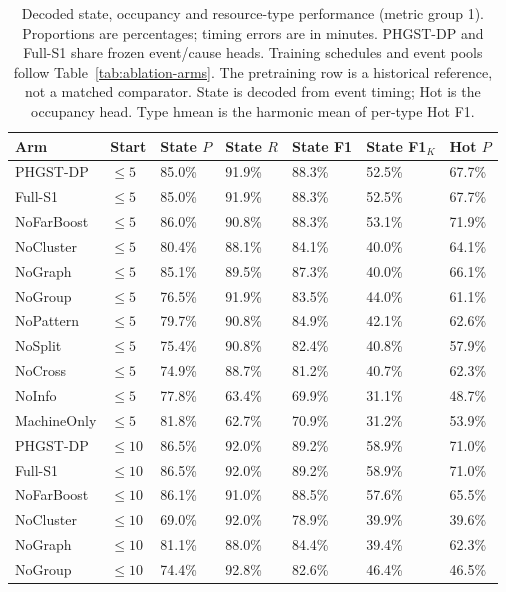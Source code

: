 \begin{table}[p]
\centering
\scriptsize
\setlength{\tabcolsep}{3pt}
\renewcommand{\arraystretch}{1.12}
\caption{Decoded state, occupancy and resource-type performance (metric group 1). Proportions are percentages; timing errors are in minutes. PHGST-DP and Full-S1 share frozen event/cause heads. Training schedules and event pools follow Table~\ref{tab:ablation-arms}. The pretraining row is a historical reference, not a matched comparator. State is decoded from event timing; Hot is the occupancy head. Type hmean is the harmonic mean of per-type Hot F1.}
\label{tab:complete-3-1}
\begin{tabularx}{\textwidth}{@{}lXXXXXX@{}}
\toprule
Arm & Start & State $P$ & State $R$ & State F1 & State F1$_K$ & Hot $P$ \\
\midrule
PHGST-DP & $\le 5$ & 85.0\% & 91.9\% & 88.3\% & 52.5\% & 67.7\% \\
Full-S1 & $\le 5$ & 85.0\% & 91.9\% & 88.3\% & 52.5\% & 67.7\% \\
NoFarBoost & $\le 5$ & 86.0\% & 90.8\% & 88.3\% & 53.1\% & 71.9\% \\
NoCluster & $\le 5$ & 80.4\% & 88.1\% & 84.1\% & 40.0\% & 64.1\% \\
NoGraph & $\le 5$ & 85.1\% & 89.5\% & 87.3\% & 40.0\% & 66.1\% \\
NoGroup & $\le 5$ & 76.5\% & 91.9\% & 83.5\% & 44.0\% & 61.1\% \\
NoPattern & $\le 5$ & 79.7\% & 90.8\% & 84.9\% & 42.1\% & 62.6\% \\
NoSplit & $\le 5$ & 75.4\% & 90.8\% & 82.4\% & 40.8\% & 57.9\% \\
NoCross & $\le 5$ & 74.9\% & 88.7\% & 81.2\% & 40.7\% & 62.3\% \\
NoInfo & $\le 5$ & 77.8\% & 63.4\% & 69.9\% & 31.1\% & 48.7\% \\
MachineOnly & $\le 5$ & 81.8\% & 62.7\% & 70.9\% & 31.2\% & 53.9\% \\
\midrule
PHGST-DP & $\le 10$ & 86.5\% & 92.0\% & 89.2\% & 58.9\% & 71.0\% \\
Full-S1 & $\le 10$ & 86.5\% & 92.0\% & 89.2\% & 58.9\% & 71.0\% \\
NoFarBoost & $\le 10$ & 86.1\% & 91.0\% & 88.5\% & 57.6\% & 65.5\% \\
NoCluster & $\le 10$ & 69.0\% & 92.0\% & 78.9\% & 39.9\% & 39.6\% \\
NoGraph & $\le 10$ & 81.1\% & 88.0\% & 84.4\% & 39.4\% & 62.3\% \\
NoGroup & $\le 10$ & 74.4\% & 92.8\% & 82.6\% & 46.4\% & 46.5\% \\

\end{tabularx}
\end{table}
